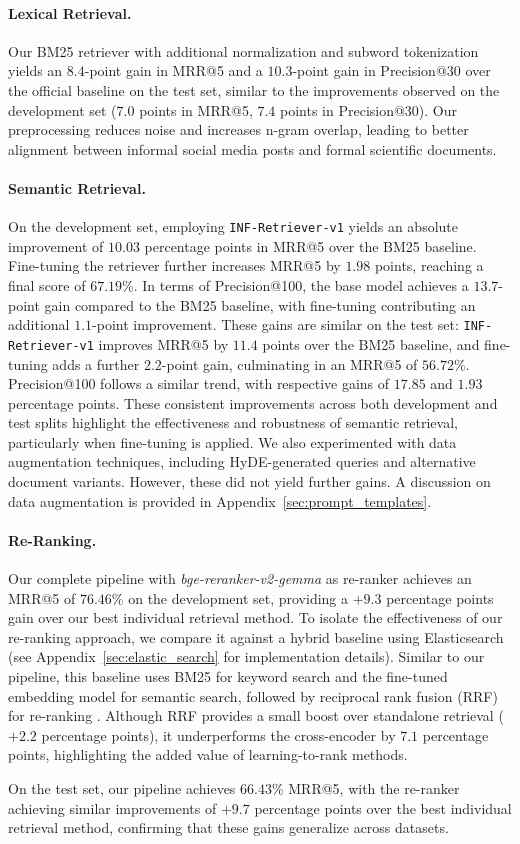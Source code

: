\paragraph{Lexical Retrieval.}
Our BM25 retriever with additional normalization and subword tokenization yields an $8.4$-point gain in MRR@5 and a $10.3$-point gain in Precision@30 over the official baseline on the test set, similar to the improvements observed on the development set ($7.0$ points in MRR@5, $7.4$ points in Precision@30). Our preprocessing reduces noise and increases n-gram overlap, leading to better alignment between informal social media posts and formal scientific documents. 


\paragraph{Semantic Retrieval.}
On the development set, employing \texttt{INF-Retriever-v1} yields an absolute improvement of $10.03$ percentage points in MRR@5 over the BM25 baseline. Fine-tuning the retriever further increases MRR@5 by $1.98$ points, reaching a final score of $67.19$\%. In terms of Precision@100, the base model achieves a $13.7$-point gain compared to the BM25 baseline, with fine-tuning contributing an additional $1.1$-point improvement. These gains are similar on the test set: \texttt{INF-Retriever-v1} improves MRR@5 by $11.4$ points over the BM25 baseline, and fine-tuning adds a further $2.2$-point gain, culminating in an MRR@5 of $56.72$\%. Precision@100 follows a similar trend, with respective gains of $17.85$ and $1.93$ percentage points. These consistent improvements across both development and test splits highlight the effectiveness and robustness of semantic retrieval, particularly when fine-tuning is applied.
We also experimented with data augmentation techniques, including HyDE-generated queries and alternative document variants. However, these did not yield further gains. A discussion on data augmentation is provided in Appendix~\ref{sec:prompt_templates}.

\paragraph{Re-Ranking.}
Our complete pipeline with \textit{bge-reranker-v2-gemma} as re-ranker achieves an MRR@5 of $76.46$\% on the development set, providing a $+9.3$ percentage points gain over our best individual retrieval method.
To isolate the effectiveness of our re-ranking approach, we compare it against a hybrid baseline using Elasticsearch (see Appendix~\ref{sec:elastic_search} for implementation details). Similar to our pipeline, this baseline uses BM25 for keyword search and the fine-tuned embedding model for semantic search, followed by reciprocal rank fusion (RRF) for re-ranking \cite{cormack_reciprocal_2009}. Although RRF provides a small boost over standalone retrieval ($+2.2$ percentage points), it underperforms the cross-encoder by $7.1$ percentage points, highlighting the added value of learning-to-rank methods.

On the test set, our pipeline achieves $66.43$\% MRR@5, with the re-ranker achieving similar improvements of $+9.7$ percentage points over the best individual retrieval method, confirming that these gains generalize across datasets.
